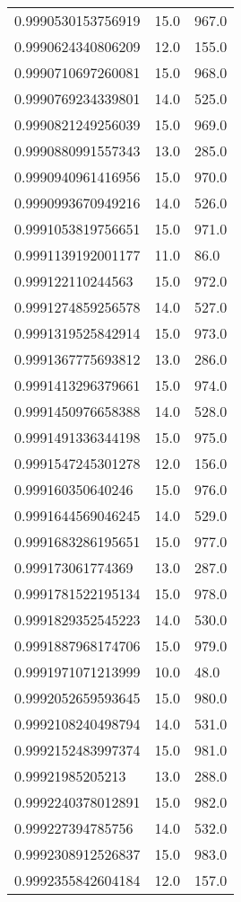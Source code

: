 \begin{center}
\begin{supertabular}[H]{p{0.30\textwidth}p{0.05\textwidth}p{0.05\textwidth}}
0.9990530153756919 & 15.0 & 967.0 \\ 
0.9990624340806209 & 12.0 & 155.0 \\ 
0.9990710697260081 & 15.0 & 968.0 \\ 
0.9990769234339801 & 14.0 & 525.0 \\ 
0.9990821249256039 & 15.0 & 969.0 \\ 
0.9990880991557343 & 13.0 & 285.0 \\ 
0.9990940961416956 & 15.0 & 970.0 \\ 
0.9990993670949216 & 14.0 & 526.0 \\ 
0.9991053819756651 & 15.0 & 971.0 \\ 
0.9991139192001177 & 11.0 & 86.0 \\ 
0.999122110244563 & 15.0 & 972.0 \\ 
0.9991274859256578 & 14.0 & 527.0 \\ 
0.9991319525842914 & 15.0 & 973.0 \\ 
0.9991367775693812 & 13.0 & 286.0 \\ 
0.9991413296379661 & 15.0 & 974.0 \\ 
0.9991450976658388 & 14.0 & 528.0 \\ 
0.9991491336344198 & 15.0 & 975.0 \\ 
0.9991547245301278 & 12.0 & 156.0 \\ 
0.999160350640246 & 15.0 & 976.0 \\ 
0.9991644569046245 & 14.0 & 529.0 \\ 
0.9991683286195651 & 15.0 & 977.0 \\ 
0.999173061774369 & 13.0 & 287.0 \\ 
0.9991781522195134 & 15.0 & 978.0 \\ 
0.9991829352545223 & 14.0 & 530.0 \\ 
0.9991887968174706 & 15.0 & 979.0 \\ 
0.9991971071213999 & 10.0 & 48.0 \\ 
0.9992052659593645 & 15.0 & 980.0 \\ 
0.9992108240498794 & 14.0 & 531.0 \\ 
0.9992152483997374 & 15.0 & 981.0 \\ 
0.99921985205213 & 13.0 & 288.0 \\ 
0.9992240378012891 & 15.0 & 982.0 \\ 
0.999227394785756 & 14.0 & 532.0 \\ 
0.9992308912526837 & 15.0 & 983.0 \\ 
0.9992355842604184 & 12.0 & 157.0 \\ 

\end{supertabular}
\end{center}
